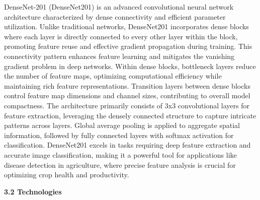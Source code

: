 \documentclass[12pt, English]{article}
\begin{document}
\begin{normalsize}
DenseNet-201 (DenseNet201) is an advanced convolutional neural network architecture characterized by dense connectivity and efficient parameter utilization. Unlike traditional networks, DenseNet201 incorporates dense blocks where each layer is directly connected to every other layer within the block, promoting feature reuse and effective gradient propagation during training. This connectivity pattern enhances feature learning and mitigates the vanishing gradient problem in deep networks. Within dense blocks, bottleneck layers reduce the number of feature maps, optimizing computational efficiency while maintaining rich feature representations. Transition layers between dense blocks control feature map dimensions and channel sizes, contributing to overall model compactness. The architecture primarily consists of 3x3 convolutional layers for feature extraction, leveraging the densely connected structure to capture intricate patterns across layers. Global average pooling is applied to aggregate spatial information, followed by fully connected layers with softmax activation for classification. DenseNet201 excels in tasks requiring deep feature extraction and accurate image classification, making it a powerful tool for applications like disease detection in agriculture, where precise feature analysis is crucial for optimizing crop health and productivity.\\








\newpage
\begin{large}
\textbf{3.2 Technologies}\\  
\end{large}


\end{normalsize}
\end{document}
